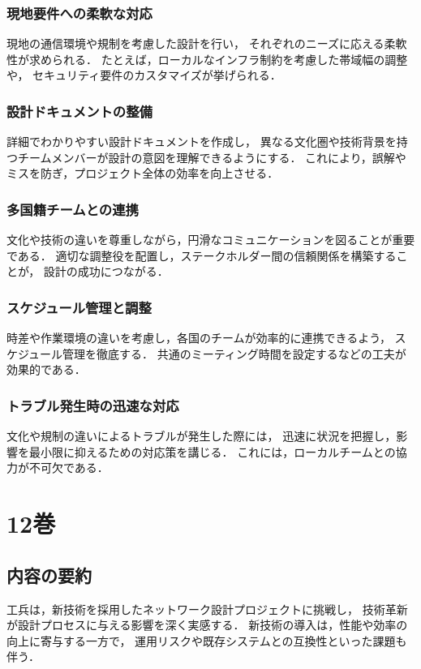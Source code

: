 \documentclass[titlepage,a4paper]{jsarticle}
\begin{document}
\subsubsection{現地要件への柔軟な対応}
現地の通信環境や規制を考慮した設計を行い，
それぞれのニーズに応える柔軟性が求められる．
たとえば，ローカルなインフラ制約を考慮した帯域幅の調整や，
セキュリティ要件のカスタマイズが挙げられる．

\subsubsection{設計ドキュメントの整備}
詳細でわかりやすい設計ドキュメントを作成し，
異なる文化圏や技術背景を持つチームメンバーが設計の意図を理解できるようにする．
これにより，誤解やミスを防ぎ，プロジェクト全体の効率を向上させる．

\subsubsection{多国籍チームとの連携}
文化や技術の違いを尊重しながら，円滑なコミュニケーションを図ることが重要である．
適切な調整役を配置し，ステークホルダー間の信頼関係を構築することが，
設計の成功につながる．

\subsubsection{スケジュール管理と調整}
時差や作業環境の違いを考慮し，各国のチームが効率的に連携できるよう，
スケジュール管理を徹底する．
共通のミーティング時間を設定するなどの工夫が効果的である．

\subsubsection{トラブル発生時の迅速な対応}
文化や規制の違いによるトラブルが発生した際には，
迅速に状況を把握し，影響を最小限に抑えるための対応策を講じる．
これには，ローカルチームとの協力が不可欠である．
\newpage
\section{12巻}
\subsection{内容の要約}
工兵は，新技術を採用したネットワーク設計プロジェクトに挑戦し，
技術革新が設計プロセスに与える影響を深く実感する．
新技術の導入は，性能や効率の向上に寄与する一方で，
運用リスクや既存システムとの互換性といった課題も伴う．
\end{document}
